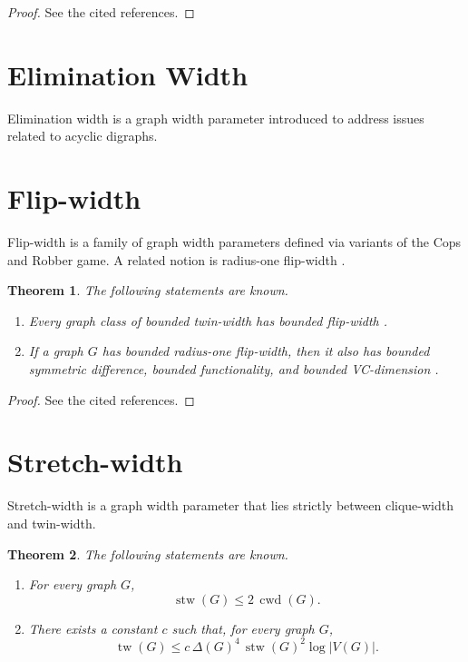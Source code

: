 \documentclass[10pt]{book}
\newtheorem{theorem}{Theorem}[section]
\theoremstyle{definition}
\begin{document}
\begin{proof}
See the cited references.
\end{proof}

\section{Elimination Width}
Elimination width \cite{97} is a graph width parameter introduced to address issues related to acyclic digraphs.

\section{Flip-width}
Flip-width \cite{117} is a family of graph width parameters defined via variants of the Cops and Robber game.  
A related notion is radius-one flip-width \cite{344}.

\begin{theorem}
The following statements are known.
\begin{enumerate}
    \item Every graph class of bounded twin-width has bounded flip-width \cite{344}.

    \item If a graph \(G\) has bounded radius-one flip-width, then it also has bounded symmetric difference, bounded functionality, and bounded VC-dimension \cite{344}.
\end{enumerate}
\end{theorem}

\begin{proof}
See the cited references.
\end{proof}


\section{Stretch-width}
Stretch-width \cite{118} is a graph width parameter that lies strictly between clique-width and twin-width.

\begin{theorem}
The following statements are known.
\begin{enumerate}
    \item For every graph \(G\),
    \[
    \operatorname{stw}(G)\leq 2\,\operatorname{cwd}(G).
    \]
    \cite{118}

    \item There exists a constant \(c\) such that, for every graph \(G\),
    \[
    \operatorname{tw}(G)\leq c\,\Delta(G)^4\,\operatorname{stw}(G)^2 \log |V(G)|.
    \]
\end{enumerate}
\end{theorem}
\end{document}
